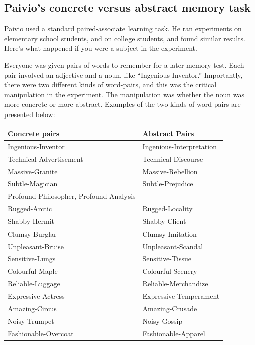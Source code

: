 \documentclass[
  oneside,
  12pt]{crumpbook}
\begin{document}
\hypertarget{paivios-concrete-versus-abstract-memory-task}{%
\subsection{Paivio's concrete versus abstract memory task}\label{paivios-concrete-versus-abstract-memory-task}}

Paivio used a standard paired-associate learning task. He ran experiments on elementary school students, and on college students, and found similar results. Here's what happened if you were a subject in the experiment.

Everyone was given pairs of words to remember for a later memory test. Each pair involved an adjective and a noun, like ``Ingenious-Inventor.'' Importantly, there were two different kinds of word-pairs, and this was the critical manipulation in the experiment. The manipulation was whether the noun was more concrete or more abstract. Examples of the two kinds of word pairs are presented below:

\begin{longtable}[]{@{}ll@{}}
\toprule
Concrete pairs & Abstract Pairs \\
\midrule
\endhead
Ingenious-Inventor & Ingenious-Interpretation \\
Technical-Advertisement & Technical-Discourse \\
Massive-Granite & Massive-Rebellion \\
Subtle-Magician & Subtle-Prejudice \\
Profound-Philosopher, Profound-Analysis & \\
Rugged-Arctic & Rugged-Locality \\
Shabby-Hermit & Shabby-Client \\
Clumsy-Burglar & Clumsy-Imitation \\
Unpleasant-Bruise & Unpleasant-Scandal \\
Sensitive-Lungs & Sensitive-Tissue \\
Colourful-Maple & Colourful-Scenery \\
Reliable-Luggage & Reliable-Merchandize \\
Expressive-Actress & Expressive-Temperament \\
Amazing-Circus & Amazing-Crusade \\
Noisy-Trumpet & Noisy-Gossip \\
Fashionable-Overcoat & Fashionable-Apparel \\
\bottomrule
\end{longtable}
\end{document}
